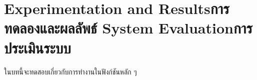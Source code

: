 \chapter{\ifproject%
\ifenglish Experimentation and Results\else การทดลองและผลลัพธ์\fi
\else%
\ifenglish System Evaluation\else การประเมินระบบ\fi
\fi}

ในบทนี้จะทดสอบเกี่ยวกับการทำงานในฟังก์ชันหลัก ๆ
